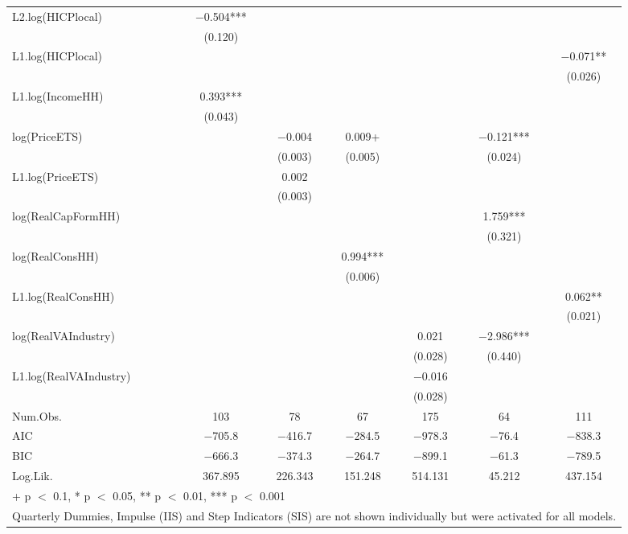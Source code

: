 \begin{table}
{\begin{tabular}[t]{lcccccc}
L2.log(HICPlocal) & \num{-0.504}*** &  &  &  &  & \\
 & (\num{0.120}) &  &  &  &  & \\
L1.log(HICPlocal) &  &  &  &  &  & \num{-0.071}**\\
 &  &  &  &  &  & (\num{0.026})\\
L1.log(IncomeHH) & \num{0.393}*** &  &  &  &  & \\
 & (\num{0.043}) &  &  &  &  & \\
log(PriceETS) &  & \num{-0.004} & \num{0.009}+ &  & \num{-0.121}*** & \\
 &  & (\num{0.003}) & (\num{0.005}) &  & (\num{0.024}) & \\
L1.log(PriceETS) &  & \num{0.002} &  &  &  & \\
 &  & (\num{0.003}) &  &  &  & \\
log(RealCapFormHH) &  &  &  &  & \num{1.759}*** & \\
 &  &  &  &  & (\num{0.321}) & \\
log(RealConsHH) &  &  & \num{0.994}*** &  &  & \\
 &  &  & (\num{0.006}) &  &  & \\
L1.log(RealConsHH) &  &  &  &  &  & \num{0.062}**\\
 &  &  &  &  &  & (\num{0.021})\\
log(RealVAIndustry) &  &  &  & \num{0.021} & \num{-2.986}*** & \\
 &  &  &  & (\num{0.028}) & (\num{0.440}) & \\
L1.log(RealVAIndustry) &  &  &  & \num{-0.016} &  & \\
 &  &  &  & (\num{0.028}) &  & \\
\midrule
Num.Obs. & \num{103} & \num{78} & \num{67} & \num{175} & \num{64} & \num{111}\\
AIC & \num{-705.8} & \num{-416.7} & \num{-284.5} & \num{-978.3} & \num{-76.4} & \num{-838.3}\\
BIC & \num{-666.3} & \num{-374.3} & \num{-264.7} & \num{-899.1} & \num{-61.3} & \num{-789.5}\\
Log.Lik. & \num{367.895} & \num{226.343} & \num{151.248} & \num{514.131} & \num{45.212} & \num{437.154}\\
\bottomrule
\multicolumn{7}{l}{\rule{0pt}{1em}+ p $<$ 0.1, * p $<$ 0.05, ** p $<$ 0.01, *** p $<$ 0.001}\\
\multicolumn{7}{l}{\rule{0pt}{1em}Quarterly Dummies, Impulse (IIS) and Step Indicators (SIS) are not shown individually but were activated for all models.}\\
\end{tabular}}
\end{table}
